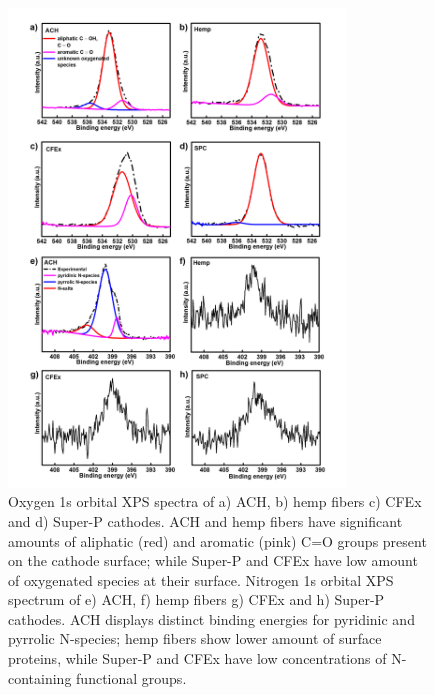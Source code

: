 \begin{figure}[tbh!]
  \centering
  \includegraphics[width=0.8\textwidth]{Figures/chap5fig/xpson}
    \caption{Oxygen 1s orbital XPS spectra of a) ACH, b) hemp fibers c) CFEx and d) Super-P cathodes. ACH and hemp fibers have significant amounts of aliphatic (red) and aromatic (pink) C=O groups present on the cathode surface; while Super-P and CFEx have low amount of oxygenated species at their surface. Nitrogen 1s orbital XPS spectrum of e) ACH, f) hemp fibers g) CFEx and h) Super-P cathodes. ACH displays distinct binding energies for pyridinic and pyrrolic N-species; hemp fibers show lower amount of surface proteins, while Super-P and CFEx have low concentrations of N-containing functional groups.}
  \label{Figures/chap5fig:xpson}
\end{figure}

